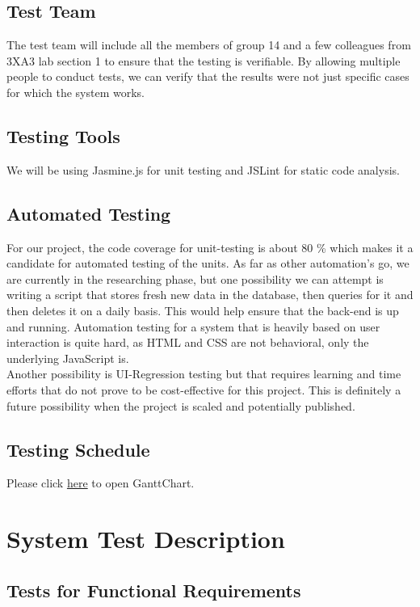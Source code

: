 \documentclass[12pt, titlepage]{article}
\begin{document}
\subsection{Test Team}
The test team will include all the members of group 14 and a few colleagues from 3XA3 lab section 1 to ensure that the testing is verifiable. By allowing multiple people to conduct tests, we can verify that the results were not just specific cases for which the system works.

\subsection{Testing Tools}
We will be using Jasmine.js for unit testing and JSLint for static code analysis.

\subsection{Automated Testing}
For our project, the code coverage for unit-testing is about 80 \% which makes it a candidate for automated testing of the units. As far as other automation's go, we are currently in the researching phase, but one possibility we can attempt is writing a script that stores fresh new data in the database, then queries for it and then deletes it on a daily basis. This would help ensure that the back-end is up and running. Automation testing for a system that is heavily based on user interaction is quite hard, as HTML and CSS are not behavioral, only the underlying JavaScript is.\\

Another possibility is UI-Regression testing but that requires learning and time efforts that do not prove to be cost-effective for this project. This is definitely a future possibility when the project is scaled and potentially published. 

\subsection{Testing Schedule}
		
Please click \href{run:../../ProjectSchedule/GanttChart.gan}{here} to open GanttChart.

\section{System Test Description}
	
\subsection{Tests for Functional Requirements}
\end{document}
